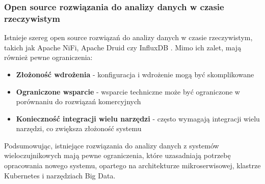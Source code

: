 \subsubsection{Open source rozwiązania do analizy danych w czasie rzeczywistym}
\label{subsubsec:open_source}

Istnieje szereg open source rozwiązań do analizy danych w czasie rzeczywistym, takich jak Apache NiFi,
Apache Druid czy InfluxDB . Mimo ich zalet, mają również pewne ograniczenia:

\begin{itemize}
    \item \textbf{Złożoność wdrożenia} - konfiguracja i wdrożenie mogą być skomplikowane
    \item \textbf{Ograniczone wsparcie} - wsparcie techniczne może być ograniczone w porównaniu do rozwiązań komercyjnych
    \item \textbf{Konieczność integracji wielu narzędzi} - często wymagają integracji wielu narzędzi, co zwiększa złożoność systemu
\end{itemize}

Podsumowując, istniejące rozwiązania do analizy danych z systemów wieloczujnikowych mają pewne ograniczenia,
które uzasadniają potrzebę opracowania nowego systemu, opartego na architekturze mikroserwisowej, klastrze Kubernetes i narzędziach Big Data.
